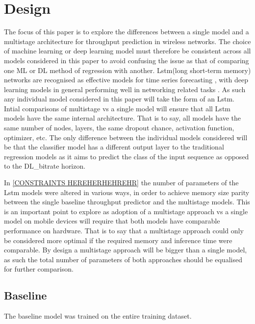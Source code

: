 \chapter{Design}
The focus of this paper is to explore the differences between a single model and a multistage architecture for throughput prediction in wireless networks. The choice of machine learning or deep learning model must therefore be consistent across all models considered in this paper to avoid confusing the issue as that of comparing one ML or DL method of regression with another. Lstm(long short-term memory) networks are recognised as effective models for time series forecasting \cite{8614252}, with deep learning models in general performing well in networking related tasks \cite{8666641}. As such any individual model considered in this paper will take the form of an Lstm. Intial comparisons of multistage vs a single model will ensure that all Lstm models have the same internal architecture. That is to say, all models have the same number of nodes, layers, the same dropout chance, activation function, optimizer, etc. The only difference between the individual models considered will be that the classifier model has a different output layer to the traditional regression models as it aims to predict the class of the input sequence as opposed to the DL_bitrate horizon.

In \ref{CONSTRAINTS HEREHERHEHREHR} the number of parameters of the Lstm models were altered in various ways, in order to achieve memory size parity between the single baseline throughput predictor and the multistage models. This is an important point to explore as adoption of a multistage approach vs a single model on mobile devices will require that both models have comparable performance on hardware. That is to say that a multistage approach could only be considered more optimal if the required memory and inference time were comparable. By design a multistage approach will be bigger than a single model, as such the total number of parameters of both approaches should be equalised for further comparison.


\section{Baseline}
The baseline model was trained on the entire training dataset.

